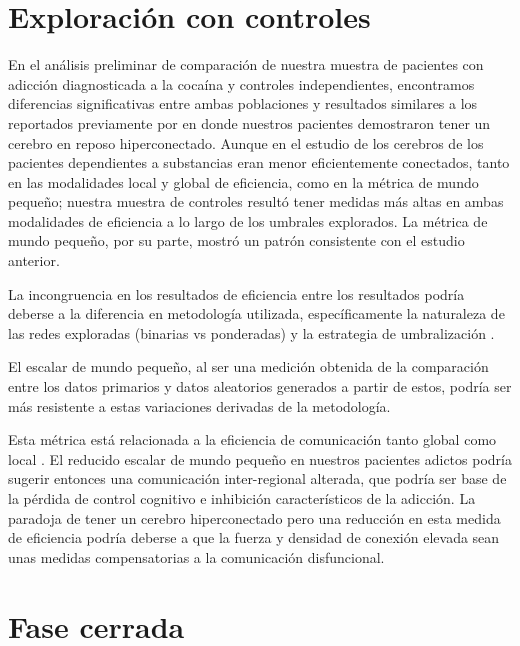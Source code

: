 \section{Exploración con controles}
En el análisis preliminar de comparación de nuestra muestra de pacientes con adicción diagnosticada a la cocaína y controles independientes, encontramos diferencias significativas entre ambas poblaciones y resultados similares a los reportados previamente por \textcite{Wang2015a} en donde nuestros pacientes demostraron tener un cerebro en reposo hiperconectado. Aunque en el estudio de \textcite{Wang2015a} los cerebros de los pacientes dependientes a substancias eran menor eficientemente conectados, tanto en las modalidades local y global de eficiencia, como en la métrica de mundo pequeño; nuestra muestra de controles resultó tener medidas más altas en ambas modalidades de eficiencia a lo largo de los umbrales explorados. La métrica de mundo pequeño, por su parte, mostró un patrón consistente con el estudio anterior. \par
La incongruencia en los resultados de eficiencia entre los resultados podría deberse a la diferencia en metodología utilizada, específicamente la naturaleza de las redes exploradas (binarias vs ponderadas) y la estrategia de umbralización \parencite{Hallquist2018}. \par
El escalar de mundo pequeño, al ser una medición obtenida de la comparación entre los datos primarios y datos aleatorios generados a partir de estos, podría ser más resistente a estas variaciones derivadas de la metodología. \par
Esta métrica está relacionada a la eficiencia de comunicación tanto global como local \parencite{Latora2001}. El reducido escalar de mundo pequeño en nuestros pacientes adictos podría sugerir entonces una comunicación inter-regional alterada, que podría ser base de la pérdida de control cognitivo e inhibición característicos de la adicción. La paradoja de tener un cerebro hiperconectado pero una reducción en esta medida de eficiencia podría deberse a que la fuerza y densidad de conexión elevada sean unas medidas compensatorias a la comunicación disfuncional.

\section{Fase cerrada}
